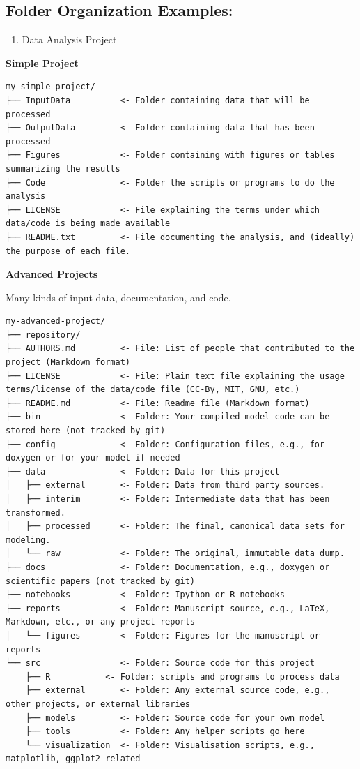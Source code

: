 \documentclass[
]{book}
\providecommand{\tightlist}{%
  \setlength{\itemsep}{0pt}\setlength{\parskip}{0pt}}
\begin{document}
\hypertarget{folder-organization-examples}{%
\subsection{Folder Organization Examples:}\label{folder-organization-examples}}

\begin{enumerate}
\def\labelenumi{\arabic{enumi})}
\tightlist
\item
  Data Analysis Project
\end{enumerate}

\textbf{Simple Project}

\begin{verbatim}
my-simple-project/
├── InputData          <- Folder containing data that will be processed
├── OutputData         <- Folder containing data that has been processed
├── Figures            <- Folder containing with figures or tables summarizing the results
├── Code               <- Folder the scripts or programs to do the analysis
├── LICENSE            <- File explaining the terms under which data/code is being made available
├── README.txt         <- File documenting the analysis, and (ideally) the purpose of each file.
\end{verbatim}

\textbf{Advanced Projects}

Many kinds of input data, documentation, and code.

\begin{verbatim}
my-advanced-project/
├── repository/
├── AUTHORS.md         <- File: List of people that contributed to the project (Markdown format)
├── LICENSE            <- File: Plain text file explaining the usage terms/license of the data/code file (CC-By, MIT, GNU, etc.)
├── README.md          <- File: Readme file (Markdown format)
├── bin                <- Folder: Your compiled model code can be stored here (not tracked by git)
├── config             <- Folder: Configuration files, e.g., for doxygen or for your model if needed
├── data               <- Folder: Data for this project
│   ├── external       <- Folder: Data from third party sources.
│   ├── interim        <- Folder: Intermediate data that has been transformed.
│   ├── processed      <- Folder: The final, canonical data sets for modeling.
│   └── raw            <- Folder: The original, immutable data dump.
├── docs               <- Folder: Documentation, e.g., doxygen or scientific papers (not tracked by git)
├── notebooks          <- Folder: Ipython or R notebooks
├── reports            <- Folder: Manuscript source, e.g., LaTeX, Markdown, etc., or any project reports
│   └── figures        <- Folder: Figures for the manuscript or reports
└── src                <- Folder: Source code for this project
    ├── R           <- Folder: scripts and programs to process data
    ├── external       <- Folder: Any external source code, e.g., other projects, or external libraries
    ├── models         <- Folder: Source code for your own model
    ├── tools          <- Folder: Any helper scripts go here
    └── visualization  <- Folder: Visualisation scripts, e.g., matplotlib, ggplot2 related
\end{verbatim}
\end{document}
